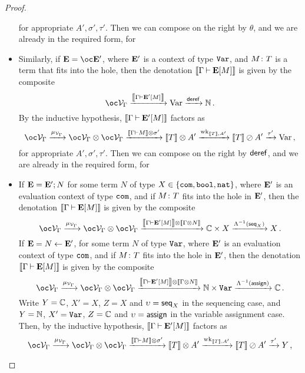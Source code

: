 \documentclass[11pt]{report}
\begin{document}
\begin{proof}
\begin{itemize}
\[        \]
      for appropriate $A',\sigma',\tau'$.  
      Then we can compose on the right by $\theta$, and we are already in the required form, for
    \item Similarly, if $\EE = \oc\EE'$, where ${\mathbf{E}}'$ is a context of type ${\mathtt{Var}}$, and $M\colon T$ is a term that fits into the hole, then the denotation $\left\llbracket\Gamma\mathbin{\vdash}{\mathbf{E}}[M]\right\rrbracket$ is given by the composite
      \[
        \oc \V_\Gamma \xrightarrow{\deno{\Gamma \ts \EE'[M]}} \Varr \xrightarrow{\dereff} \bN\,.
        \]
      By the inductive hypothesis, $\left\llbracket\Gamma\mathbin{\vdash}{\mathbf{E}}'[M]\right\rrbracket$ factors as
      \[
        \oc\V_\Gamma \xrightarrow{\mu_{\V_\Gamma}} \oc \V_\Gamma \tensor \oc \V_\Gamma \xrightarrow{\deno{\Gamma\ts M}\tensor\sigma'} \deno{T}\tensor A' \xrightarrow{\wk_{\deno{T},A'}} \deno{T} \sequoid A' \xrightarrow{\tau'} \Varr\,,
        \]
      for appropriate $A',\sigma',\tau'$.  
      Then we can compose on the right by $\operatorname{\mathsf{deref}}$, and we are already in the required form, for
    \item If ${\mathbf{E}}={\mathbf{E}}';N$ for some term $N$ of type $X\in\{{\mathtt{com}},{\mathtt{bool}},{\mathtt{nat}}\}$, where ${\mathbf{E}}'$ is an evaluation context of type ${\mathtt{com}}$, and if $M\colon T$ fits into the hole in ${\mathbf{E}}'$, then the denotation $\left\llbracket\Gamma\mathbin{\vdash}{\mathbf{E}}[M]\right\rrbracket$ is given by the composite
      \[
        \oc\V_\Gamma \xrightarrow{\mu_{\V_\Gamma}} \oc\V_\Gamma \tensor \oc\V_\Gamma \xrightarrow{\deno{\Gamma\ts\EE'[M]}\tensor\deno{\Gamma\tensor N}} \bC \times X \xrightarrow{\Lambda\inv(\seq_X)} X\,.
        \]
      If ${\mathbf{E}} = N\gets{\mathbf{E}}'$, for some term $N$ of type ${\mathtt{Var}}$, where ${\mathbf{E}}'$ is an evaluation context of type ${\mathtt{com}}$, and if $M\colon T$ fits into the hole in ${\mathbf{E}}'$, then the denotation $\left\llbracket\Gamma\mathbin{\vdash}{\mathbf{E}}[M]\right\rrbracket$ is given by the composite
      \[
        \oc\V_\Gamma \xrightarrow{\mu_{\V_\Gamma}} \oc\V_\Gamma \tensor \oc\V_\Gamma \xrightarrow{\deno{\Gamma\ts\EE'[M]}\tensor\deno{\Gamma\tensor N}} \bN \times \Var \xrightarrow{\Lambda\inv(\assign)} \bC\,.
        \]
      Write $Y=\mathbb{C}$, $X'=X$, $Z=X$ and $\upsilon=\operatorname{{\mathsf{seq}}}_X$ in the sequencing case, and $Y=\mathbb{N}$, $X'={\mathtt{Var}}$, $Z=\mathbb{C}$ and $\upsilon=\operatorname{\mathsf{assign}}$ in the variable assignment case.
      Then, by the inductive hypothesis, $\left\llbracket\Gamma\mathbin{\vdash}{\mathbf{E}}'[M]\right\rrbracket$ factors as
      \[
        \oc\V_\Gamma \xrightarrow{\mu_{\V_\Gamma}} \oc \V_\Gamma \tensor \oc \V_\Gamma \xrightarrow{\deno{\Gamma\ts M}\tensor\sigma'} \deno{T}\tensor A' \xrightarrow{\wk_{\deno{T},A'}} \deno{T} \sequoid A' \xrightarrow{\tau'} Y\,,
\]
\end{itemize}
\end{proof}
\end{document}
